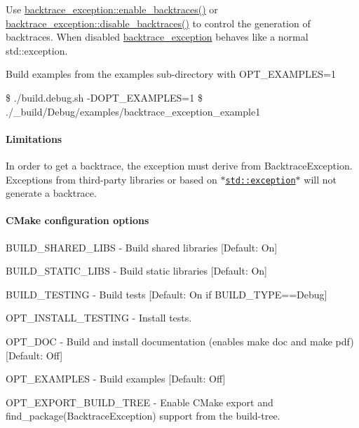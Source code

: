 \begin{DoxyItemize}
\item Use {\ttfamily \hyperlink{namespacebacktrace__exception_a4e1b86dea1b116c7bac88d89448a808e}{backtrace\-\_\-exception\-::enable\-\_\-backtraces()}} or {\ttfamily \hyperlink{namespacebacktrace__exception_a134895cbad5bc441a941f1f49b43a78a}{backtrace\-\_\-exception\-::disable\-\_\-backtraces()}} to control the generation of backtraces. When disabled \hyperlink{namespacebacktrace__exception}{backtrace\-\_\-exception} behaves like a normal {\ttfamily std\-::exception}.
\item Build examples from the examples sub-\/directory with {\ttfamily O\-P\-T\-\_\-\-E\-X\-A\-M\-P\-L\-E\-S=1}

\$ ./build.debug.\-sh -\/\-D\-O\-P\-T\-\_\-\-E\-X\-A\-M\-P\-L\-E\-S=1 \$ ./\-\_\-build/\-Debug/examples/backtrace\-\_\-exception\-\_\-example1
\end{DoxyItemize}

\paragraph*{Limitations}


\begin{DoxyItemize}
\item In order to get a backtrace, the exception must derive from {\ttfamily Backtrace\-Exception}. Exceptions from third-\/party libraries or based on \href{https://en.cppreference.com/w/cpp/error/exception}{\tt $\ast$std\-::exception$\ast$} will not generate a backtrace.
\end{DoxyItemize}

\paragraph*{C\-Make configuration options}


\begin{DoxyItemize}
\item {\ttfamily B\-U\-I\-L\-D\-\_\-\-S\-H\-A\-R\-E\-D\-\_\-\-L\-I\-B\-S} -\/ Build shared libraries \mbox{[}Default\-: On\mbox{]}
\item {\ttfamily B\-U\-I\-L\-D\-\_\-\-S\-T\-A\-T\-I\-C\-\_\-\-L\-I\-B\-S} -\/ Build static libraries \mbox{[}Default\-: On\mbox{]}
\item {\ttfamily B\-U\-I\-L\-D\-\_\-\-T\-E\-S\-T\-I\-N\-G} -\/ Build tests \mbox{[}Default\-: On if B\-U\-I\-L\-D\-\_\-\-T\-Y\-P\-E==Debug\mbox{]}
\item {\ttfamily O\-P\-T\-\_\-\-I\-N\-S\-T\-A\-L\-L\-\_\-\-T\-E\-S\-T\-I\-N\-G} -\/ Install tests.
\item {\ttfamily O\-P\-T\-\_\-\-D\-O\-C} -\/ Build and install documentation (enables {\ttfamily make doc} and {\ttfamily make pdf}) \mbox{[}Default\-: Off\mbox{]}
\item {\ttfamily O\-P\-T\-\_\-\-E\-X\-A\-M\-P\-L\-E\-S} -\/ Build examples \mbox{[}Default\-: Off\mbox{]}
\item {\ttfamily O\-P\-T\-\_\-\-E\-X\-P\-O\-R\-T\-\_\-\-B\-U\-I\-L\-D\-\_\-\-T\-R\-E\-E} -\/ Enable C\-Make export and {\ttfamily find\-\_\-package(\-Backtrace\-Exception)} support from the build-\/tree. 
\end{DoxyItemize}